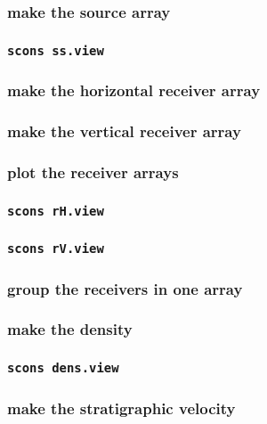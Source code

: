\begin{frame} \frametitle{make the source array}
\end{frame}
\cwpnote{}

\begin{frame} \frametitle{\texttt{scons ss.view}}
\end{frame}

\begin{frame} \frametitle{make the horizontal receiver array}
\end{frame}
\cwpnote{}

\begin{frame} \frametitle{make the vertical receiver array}
\end{frame}
\cwpnote{}

\begin{frame} \frametitle{plot the receiver arrays}
\end{frame}
\cwpnote{}

\begin{frame} \frametitle{\texttt{scons rH.view}}
\end{frame}
\begin{frame} \frametitle{\texttt{scons rV.view}}
\end{frame}

\begin{frame} \frametitle{group the receivers in one array}
\end{frame}
\cwpnote{}

\begin{frame} \frametitle{make the density}
\end{frame}
\cwpnote{}

\begin{frame} \frametitle{\texttt{scons dens.view}}
\end{frame}

\begin{frame} \frametitle{make the stratigraphic velocity}
\end{frame}
\cwpnote{}

